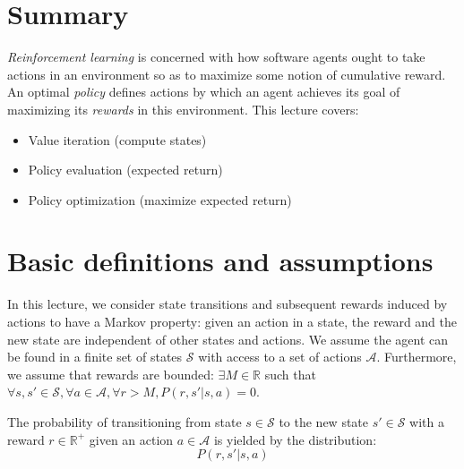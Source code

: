\documentclass{article}
\begin{document}



\section{Summary}

\textit{Reinforcement learning} is concerned with how software agents ought to take actions in an environment so as to maximize some notion of cumulative reward. An optimal \textit{policy} defines actions by which an agent achieves its goal of maximizing its \textit{rewards} in this environment. This lecture covers:
\begin{itemize}
    \item Value iteration (compute states)
    \item Policy evaluation (expected return)
    \item Policy optimization (maximize expected return)
\end{itemize}

\section{Basic definitions and assumptions}

In this lecture, we consider state transitions and subsequent rewards induced by actions to have a Markov property: given an action in a state, the reward and the new state are independent of other states and actions. We assume the agent can be found in a finite set of states $\mathcal{S}$ with access to a set of actions $\mathcal{A}$. Furthermore, we assume that rewards are bounded:
$\exists M\in \mathbb{R}$ such that $\forall s,s'\in \mathcal{S}, \forall a\in \mathcal{A},\forall r > M, P(r,s'|s,a)=0$.

\begin{defn}
The probability of transitioning from state $s\in \mathcal{S}$ to the new state $s' \in \mathcal{S}$ with a reward $r\in \mathbb R^{+}$ given an action $a\in \mathcal{A}$ is yielded by the distribution:
\[
P(r,s'|s,a)
\]
\end{defn}
\end{document}
